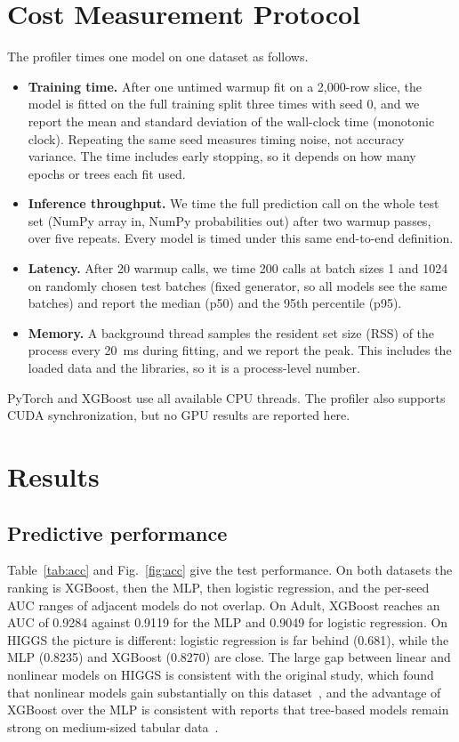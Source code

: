\documentclass[conference]{IEEEtran}
\begin{document}
\section{Cost Measurement Protocol}
\label{sec:cost}
The profiler times one model on one dataset as follows.
\begin{itemize}
\item \textbf{Training time.} After one untimed warmup fit on a 2{,}000-row slice, the model is fitted on the full training split three times with seed 0, and we report the mean and standard deviation of the wall-clock time (monotonic clock). Repeating the same seed measures timing noise, not accuracy variance. The time includes early stopping, so it depends on how many epochs or trees each fit used.
\item \textbf{Inference throughput.} We time the full prediction call on the whole test set (NumPy array in, NumPy probabilities out) after two warmup passes, over five repeats. Every model is timed under this same end-to-end definition.
\item \textbf{Latency.} After 20 warmup calls, we time 200 calls at batch sizes 1 and 1024 on randomly chosen test batches (fixed generator, so all models see the same batches) and report the median (p50) and the 95th percentile (p95).
\item \textbf{Memory.} A background thread samples the resident set size (RSS) of the process every 20~ms during fitting, and we report the peak. This includes the loaded data and the libraries, so it is a process-level number.
\end{itemize}
PyTorch and XGBoost use all available CPU threads. The profiler also supports CUDA synchronization, but no GPU results are reported here.

\section{Results}
\subsection{Predictive performance}
Table~\ref{tab:acc} and Fig.~\ref{fig:acc} give the test performance. On both datasets the ranking is XGBoost, then the MLP, then logistic regression, and the per-seed AUC ranges of adjacent models do not overlap. On Adult, XGBoost reaches an AUC of 0.9284 against 0.9119 for the MLP and 0.9049 for logistic regression. On HIGGS the picture is different: logistic regression is far behind (0.681), while the MLP (0.8235) and XGBoost (0.8270) are close. The large gap between linear and nonlinear models on HIGGS is consistent with the original study, which found that nonlinear models gain substantially on this dataset~\cite{baldi2014}, and the advantage of XGBoost over the MLP is consistent with reports that tree-based models remain strong on medium-sized tabular data~\cite{grinsztajn2022}.
\end{document}
